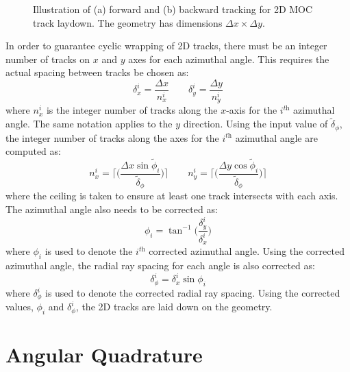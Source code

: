\begin{figure}[h!]
\begin{subfigure}{0.35\textwidth}
		\caption{}
		\label{fig:laydown-2D-b}
	\end{subfigure}
	\caption[]{Illustration of (a) forward and (b) backward tracking for 2D \ac{MOC} track laydown. The geometry has dimensions $\Delta x \times \Delta y$.}
	\label{fig:laydown-2D}
\end{figure}

In order to guarantee cyclic wrapping of 2D tracks, there must be an integer number of tracks on $x$ and $y$ axes for each azimuthal angle. This requires the actual spacing between tracks be chosen as:
\begin{equation}
\delta_x^i = \frac{\Delta x}{n_x^i} \qquad \delta_y^i = \frac{\Delta y}{n_y^i}
\label{eq:3DGT-dx-dy}
\end{equation}
where $n_x^i$ is the integer number of tracks along the $x$-axis for the $i^{\textit{th}}$ azimuthal angle. The same notation applies to the $y$ direction. Using the input value of $\tilde{\delta}_{\phi}$, the integer number of tracks along the axes for the $i^{\textit{th}}$ azimuthal angle are computed as:
\begin{equation}
n_x^i = \Bigg\lceil\Bigg(\frac{\Delta x \sin{\tilde{\phi}_i}}{\tilde{\delta}_\phi}\Bigg)\Bigg\rceil \qquad n_y^i = \Bigg\lceil\Bigg(\frac{\Delta y \cos{\tilde{\phi}_i}}{\tilde{\delta}_\phi}\Bigg) \Bigg\rceil
\label{eq:3DGT-nx-ny}
\end{equation}
where the ceiling is taken to ensure at least one track intersects with each axis. The azimuthal angle also needs to be corrected as:
\begin{equation}
\phi_i = \tan^{-1} \bigg(\frac{\delta_y^i}{\delta_x^i}\bigg)
\label{eq:azi-correct}
\end{equation}
where $\phi_i$ is used to denote the $i^{\textit{th}}$ corrected azimuthal angle. Using the corrected azimuthal angle, the radial ray spacing for each angle is also corrected as:
\begin{equation}
\delta_{\phi}^i = \delta_x^i \sin{\phi_i}
\label{eq:azi-space-correct}
\end{equation}
where $\delta_{\phi}^i$ is used to denote the corrected radial ray spacing. Using the corrected values, $\phi_i$ and $\delta_{\phi}^i$, the 2D tracks are laid down on the geometry. 


\section{Angular Quadrature}
\label{sec:angular-quadrature}


